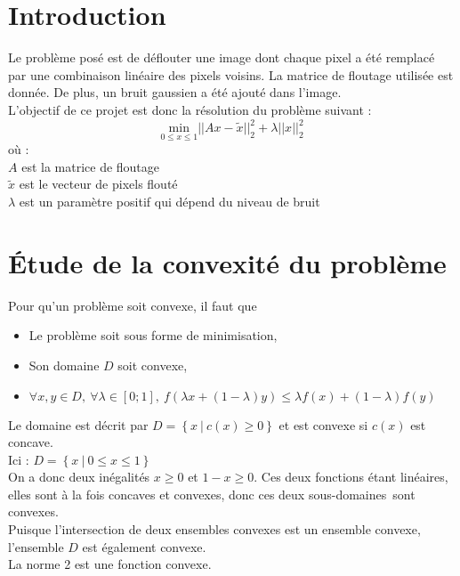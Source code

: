 \documentclass[12pt, a4paper]{report}
\begin{document}
\umonsCoverPage
\tableofcontents
\clearpage
\section{Introduction}
Le problème posé est de déflouter une image dont chaque pixel a été remplacé par une combinaison linéaire des pixels voisins. La matrice de floutage utilisée est donnée. De plus, un bruit gaussien a été ajouté dans l'image.\\
L'objectif de ce projet est donc la résolution du problème suivant :\\
\[\underset{0 \leq x \leq 1}{\mathrm{min}} ||Ax - \tilde{x}||_2^2 + \lambda||x||_2^2\]
où :\\
$A$ est la matrice de floutage\\
$\tilde{x}$ est le vecteur de pixels flouté\\
$\lambda$ est un paramètre positif qui dépend du niveau de bruit\\

\section{Étude de la convexité du problème}
\noindent
Pour qu'un problème soit convexe, il faut que
\begin{itemize}
\item Le problème soit sous forme de minimisation,
\item Son domaine $ D $ soit convexe,
\item $\forall x,y \in D,\ \forall \lambda \in \left[0;1\right],\ f(\lambda x + (1 - \lambda)y) \leq \lambda f(x) + (1-\lambda)f(y)$
\end{itemize}
\noindent
\linebreak
Le domaine est décrit par \( D = \left\{ x\ |\ c(x) \geq 0 \right\} \) et est convexe si $c(x)$ est concave.\\
Ici : \( D = \left\{ x\ |\ 0 \leq x \leq 1 \right\}\)\\
On a donc deux inégalités $x \geq 0$ et $1 - x \geq 0$. Ces deux fonctions étant linéaires, elles sont à la fois concaves et convexes, donc ces deux \og sous-domaines\fg\ sont convexes.\\
Puisque l'intersection de deux ensembles convexes est un ensemble convexe, l'ensemble $D$ est également convexe.\\

\noindent
La norme 2 est une fonction convexe.\\
\end{document}
